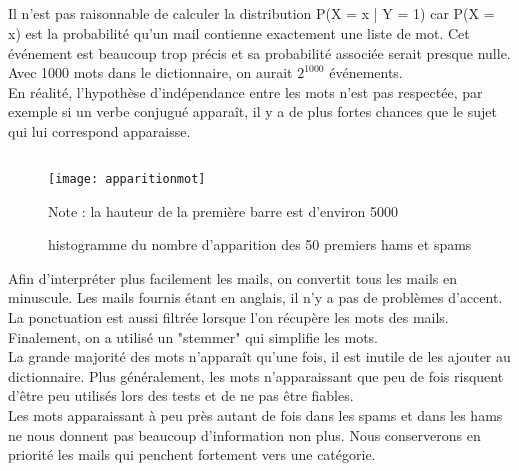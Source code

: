 \documentclass[a4paper]{article}
\begin{document}
\subsection{}
Il n'est pas raisonnable de calculer la distribution P(X = x | Y = 1) car P(X = x) est la probabilité qu'un mail contienne exactement une liste de mot. Cet événement est beaucoup trop précis et sa probabilité associée serait presque nulle. Avec 1000 mots dans le dictionnaire, on aurait $2^{1000}$ événements.\\
En réalité, l'hypothèse d'indépendance entre les mots n'est pas respectée, par exemple si un verbe conjugué apparaît, il y a de plus fortes chances que le sujet qui lui correspond apparaisse.

\subsection{}
\begin{minipage}{\textwidth}
\begin{figure}[H]
\texttt{[image: apparitionmot]}
\caption{histogramme du nombre d'apparition des 50 premiers hams et spams}
Note : la hauteur de la première barre est d'environ 5000
\end{figure}

Afin d'interpréter plus facilement les mails, on convertit tous les mails en minuscule. Les mails fournis étant en anglais, il n'y a pas de problèmes d'accent. La ponctuation est aussi filtrée lorsque l'on récupère les mots des mails. Finalement, on a utilisé un "stemmer" qui simplifie les mots.\\
La grande majorité des mots n'apparaît qu'une fois, il est inutile de les ajouter au dictionnaire. Plus généralement, les mots n'apparaissant que peu de fois risquent d'être peu utilisés lors des tests et de ne pas être fiables.\\
Les mots apparaissant à peu près autant de fois dans les spams et dans les hams ne nous donnent pas beaucoup d'information non plus. Nous conserverons en priorité les mails qui penchent fortement vers une catégorie.\\
\end{minipage}
\end{document}

